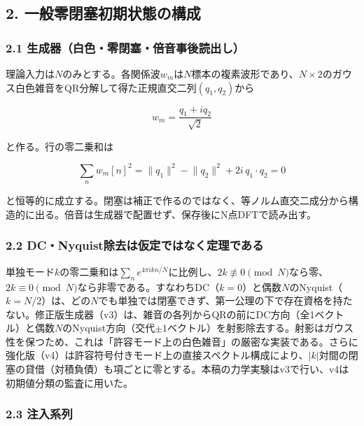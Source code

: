 \documentclass[
  a4paper,
]{ltjsarticle}
\begin{document}
\subsection{2.
一般零閉塞初期状態の構成}\label{ux4e00ux822cux96f6ux9589ux585eux521dux671fux72b6ux614bux306eux69cbux6210}

\subsubsection{2.1
生成器（白色・零閉塞・倍音事後読出し）}\label{ux751fux6210ux5668ux767dux8272ux96f6ux9589ux585eux500dux97f3ux4e8bux5f8cux8aadux51faux3057}

理論入力は\(N\)のみとする。各関係波\(w_m\)は\(N\)標本の複素波形であり、\(N\times2\)のガウス白色雑音をQR分解して得た正規直交二列\((q_1,q_2)\)から

\[w_m=\frac{q_1+iq_2}{\sqrt2}\]

と作る。行の零二乗和は

\[\sum_n w_m[n]^2=\lVert q_1\rVert^2-\lVert q_2\rVert^2+2i\,q_1\!\cdot\!q_2=0\]

と恒等的に成立する。閉塞は補正で作るのではなく、等ノルム直交二成分から構造的に出る。倍音は生成器で配置せず、保存後にN点DFTで読み出す。

\subsubsection{2.2
DC・Nyquist除去は仮定ではなく定理である}\label{dcnyquistux9664ux53bbux306fux4eeeux5b9aux3067ux306fux306aux304fux5b9aux7406ux3067ux3042ux308b}

単独モード\(k\)の零二乗和は\(\sum_n e^{4\pi ikn/N}\)に比例し、\(2k\not\equiv0\pmod N\)なら零、\(2k\equiv0\pmod N\)なら非零である。すなわちDC（\(k=0\)）と偶数\(N\)のNyquist（\(k=N/2\)）は、どの\(N\)でも単独では閉塞できず、第一公理の下で存在資格を持たない。修正版生成器（v3）は、雑音の各列からQRの前にDC方向（全1ベクトル）と偶数\(N\)のNyquist方向（交代\(\pm1\)ベクトル）を射影除去する。射影はガウス性を保つため、これは「許容モード上の白色雑音」の厳密な実装である。さらに強化版（v4）は許容符号付きモード上の直接スペクトル構成により、\(|k|\)対間の閉塞の貸借（対積負債）も項ごとに零とする。本稿の力学実験はv3で行い、v4は初期値分類の監査に用いた。

\subsubsection{2.3 注入系列}\label{ux6ce8ux5165ux7cfbux5217}
\end{document}
